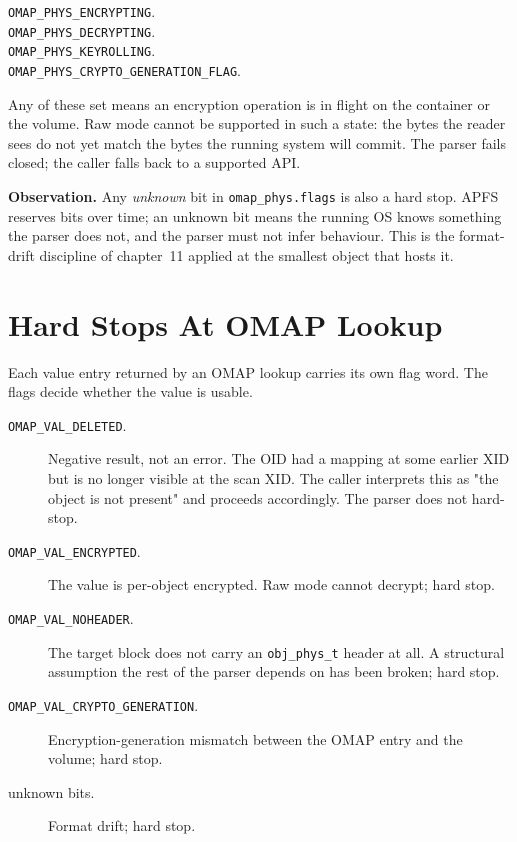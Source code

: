 \begin{description}
  \item[\texttt{OMAP\_PHYS\_ENCRYPTING}.]
  \item[\texttt{OMAP\_PHYS\_DECRYPTING}.]
  \item[\texttt{OMAP\_PHYS\_KEYROLLING}.]
  \item[\texttt{OMAP\_PHYS\_CRYPTO\_GENERATION\_FLAG}.]
\end{description}

Any of these set means an encryption operation is in flight on the
container or the volume. Raw mode cannot be supported in such a
state: the bytes the reader sees do not yet match the bytes the
running system will commit. The parser fails closed; the caller
falls back to a supported API.

\textbf{Observation.} Any \emph{unknown} bit in \texttt{omap\_phys.flags}
is also a hard stop. APFS reserves bits over time; an unknown bit
means the running OS knows something the parser does not, and the
parser must not infer behaviour. This is the format-drift discipline
of chapter~11 applied at the smallest object that hosts it.

\section{Hard Stops At OMAP Lookup}

Each value entry returned by an OMAP lookup carries its own flag
word. The flags decide whether the value is usable.

\begin{description}
  \item[\texttt{OMAP\_VAL\_DELETED}.] Negative result, not an error.
    The OID had a mapping at some earlier XID but is no longer
    visible at the scan XID. The caller interprets this as
    "the object is not present" and proceeds accordingly. The
    parser does not hard-stop.
  \item[\texttt{OMAP\_VAL\_ENCRYPTED}.] The value is per-object
    encrypted. Raw mode cannot decrypt; hard stop.
  \item[\texttt{OMAP\_VAL\_NOHEADER}.] The target block does not
    carry an \texttt{obj\_phys\_t} header at all. A structural
    assumption the rest of the parser depends on has been broken;
    hard stop.
  \item[\texttt{OMAP\_VAL\_CRYPTO\_GENERATION}.] Encryption-generation
    mismatch between the OMAP entry and the volume; hard stop.
  \item[unknown bits.] Format drift; hard stop.
\end{description}

